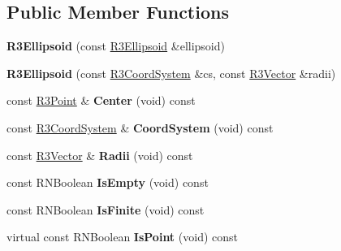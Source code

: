 \subsection*{Public Member Functions}
\begin{DoxyCompactItemize}
\item 
{\bfseries R3\+Ellipsoid} (const \hyperlink{class_r3_ellipsoid}{R3\+Ellipsoid} \&ellipsoid)\hypertarget{class_r3_ellipsoid_a01380b11c8b169200fa5854bad7b7325}{}\label{class_r3_ellipsoid_a01380b11c8b169200fa5854bad7b7325}

\item 
{\bfseries R3\+Ellipsoid} (const \hyperlink{class_r3_coord_system}{R3\+Coord\+System} \&cs, const \hyperlink{class_r3_vector}{R3\+Vector} \&radii)\hypertarget{class_r3_ellipsoid_aff8689fa86360cdd163175c62cd135d0}{}\label{class_r3_ellipsoid_aff8689fa86360cdd163175c62cd135d0}

\item 
const \hyperlink{class_r3_point}{R3\+Point} \& {\bfseries Center} (void) const \hypertarget{class_r3_ellipsoid_abf5a12db6b2ecb59462c061452bd37b5}{}\label{class_r3_ellipsoid_abf5a12db6b2ecb59462c061452bd37b5}

\item 
const \hyperlink{class_r3_coord_system}{R3\+Coord\+System} \& {\bfseries Coord\+System} (void) const \hypertarget{class_r3_ellipsoid_a2d08d79c2d5cf13a8ffd9e06f0409213}{}\label{class_r3_ellipsoid_a2d08d79c2d5cf13a8ffd9e06f0409213}

\item 
const \hyperlink{class_r3_vector}{R3\+Vector} \& {\bfseries Radii} (void) const \hypertarget{class_r3_ellipsoid_a5357d408f807072f9d978d96640aae16}{}\label{class_r3_ellipsoid_a5357d408f807072f9d978d96640aae16}

\item 
const R\+N\+Boolean {\bfseries Is\+Empty} (void) const \hypertarget{class_r3_ellipsoid_aeea13864a16cad209cd7685777b68183}{}\label{class_r3_ellipsoid_aeea13864a16cad209cd7685777b68183}

\item 
const R\+N\+Boolean {\bfseries Is\+Finite} (void) const \hypertarget{class_r3_ellipsoid_a8b141c8a15338c376a15a7864f141864}{}\label{class_r3_ellipsoid_a8b141c8a15338c376a15a7864f141864}

\item 
virtual const R\+N\+Boolean {\bfseries Is\+Point} (void) const \hypertarget{class_r3_ellipsoid_a4d024f0e86b7eb3ec7a8c7c6aba8c50c}{}\label{class_r3_ellipsoid_a4d024f0e86b7eb3ec7a8c7c6aba8c50c}


\end{DoxyCompactItemize}
